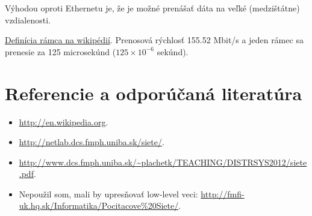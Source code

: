 \documentclass[10pt,a4paper]{article}
\begin{document}
Výhodou oproti Ethernetu je, že je možné prenášať dáta na veľké (medzištátne) vzdialenosti. 

\href{http://en.wikipedia.org/wiki/Synchronous\_optical\_networking\#SDH_frame}{Definícia rámca na wikipédií}.
Prenosová rýchlosť 155.52 Mbit/s a jeden rámec sa prenesie za 125 microsekúnd ($125 \times 10^{-6}$ sekúnd).


\section{Referencie a odporúčaná literatúra}
\begin{itemize}                                
\item \url{http://en.wikipedia.org}. 
\item \url{http://netlab.dcs.fmph.uniba.sk/siete/}. 
\item \url{http://www.dcs.fmph.uniba.sk/\~plachetk/TEACHING/DISTRSYS2012/siete.pdf}. 
\item Nepoužil som, mali by upresňovať low-level veci: \url{http://fmfi-uk.hq.sk/Informatika/Pocitacove\%20Siete/}.
\end{itemize}
\end{document}

